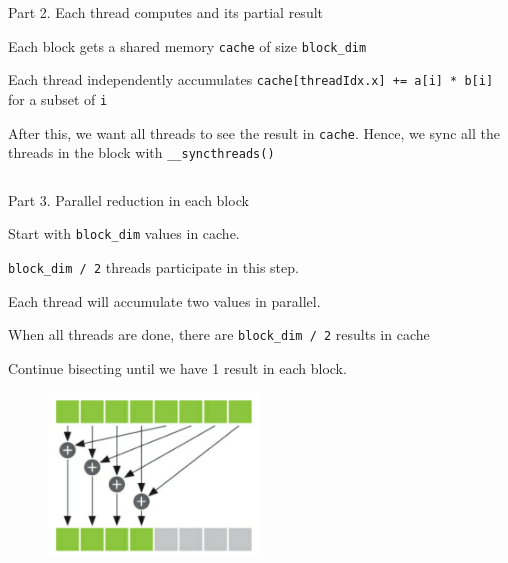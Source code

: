 \documentclass{beamer}
\begin{document}
    \begin{frame}{Part 2. Each thread computes and its partial result}
        \begin{itemize}
        {\footnotesize
        \item Each block gets a shared memory \texttt{cache} of size \texttt{block\_dim}
        \item Each thread independently accumulates \texttt{cache[threadIdx.x] += a[i] * b[i]} for a subset of \texttt{i}
        \item After this, we want all threads to see the result in \texttt{cache}.  Hence, we sync all the threads in the block with \texttt{\_\_syncthreads()}
        }
        \end{itemize}
        \begin{block}{}
            \inputminted[fontsize=\footnotesize]{cuda}{src/dot_snippet_02.cu}
        \end{block}
    \end{frame}

    \begin{frame}{Part 3.  Parallel reduction in each block}
        \begin{enumerate}
        {\footnotesize
            \item Start with \texttt{block\_dim} values in cache.
            \item \texttt{block\_dim / 2} threads participate in this step.
            \item Each thread will accumulate two values in parallel.
            \item When all threads are done, there are \texttt{block\_dim / 2} results in cache
            \item Continue bisecting until we have 1 result in each block.
        }
        \end{enumerate}
        \begin{figure}
            \centering
            \includegraphics[width=0.5\textwidth]{img/04/parallel-reduc.png}
        \end{figure}
    \end{frame}
\end{document}
